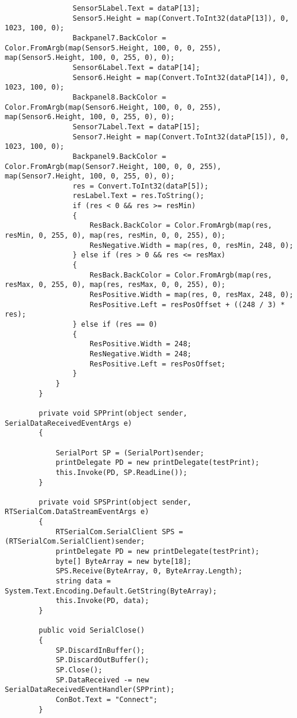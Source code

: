 \begin{lstlisting}
                Sensor5Label.Text = dataP[13];
                Sensor5.Height = map(Convert.ToInt32(dataP[13]), 0, 1023, 100, 0);
                Backpanel7.BackColor = Color.FromArgb(map(Sensor5.Height, 100, 0, 0, 255), map(Sensor5.Height, 100, 0, 255, 0), 0);
                Sensor6Label.Text = dataP[14];
                Sensor6.Height = map(Convert.ToInt32(dataP[14]), 0, 1023, 100, 0);
                Backpanel8.BackColor = Color.FromArgb(map(Sensor6.Height, 100, 0, 0, 255), map(Sensor6.Height, 100, 0, 255, 0), 0);
                Sensor7Label.Text = dataP[15];
                Sensor7.Height = map(Convert.ToInt32(dataP[15]), 0, 1023, 100, 0);
                Backpanel9.BackColor = Color.FromArgb(map(Sensor7.Height, 100, 0, 0, 255), map(Sensor7.Height, 100, 0, 255, 0), 0);
                res = Convert.ToInt32(dataP[5]);
                resLabel.Text = res.ToString();
                if (res < 0 && res >= resMin)
                {
                    ResBack.BackColor = Color.FromArgb(map(res, resMin, 0, 255, 0), map(res, resMin, 0, 0, 255), 0);
                    ResNegative.Width = map(res, 0, resMin, 248, 0);
                } else if (res > 0 && res <= resMax)
                {
                    ResBack.BackColor = Color.FromArgb(map(res, resMax, 0, 255, 0), map(res, resMax, 0, 0, 255), 0);
                    ResPositive.Width = map(res, 0, resMax, 248, 0);
                    ResPositive.Left = resPosOffset + ((248 / 3) * res);
                } else if (res == 0)
                {
                    ResPositive.Width = 248;
                    ResNegative.Width = 248;
                    ResPositive.Left = resPosOffset;
                }
            }
        }

        private void SPPrint(object sender, SerialDataReceivedEventArgs e)
        {

            SerialPort SP = (SerialPort)sender;
            printDelegate PD = new printDelegate(testPrint);
            this.Invoke(PD, SP.ReadLine());
        }

        private void SPSPrint(object sender, RTSerialCom.DataStreamEventArgs e)
        {
            RTSerialCom.SerialClient SPS = (RTSerialCom.SerialClient)sender;
            printDelegate PD = new printDelegate(testPrint);
            byte[] ByteArray = new byte[18];
            SPS.Receive(ByteArray, 0, ByteArray.Length);
            string data = System.Text.Encoding.Default.GetString(ByteArray);
            this.Invoke(PD, data);
        }

        public void SerialClose()
        {
            SP.DiscardInBuffer();
            SP.DiscardOutBuffer();
            SP.Close();
            SP.DataReceived -= new SerialDataReceivedEventHandler(SPPrint);
            ConBot.Text = "Connect";
        }


\end{lstlisting}
